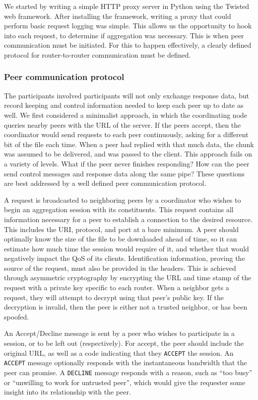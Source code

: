 \documentclass[12pt]{article}
\begin{document}
		We started by writing a simple HTTP proxy server in Python using the Twisted web framework. After installing the framework, writing a proxy that could perform basic request logging was simple. This allows us the opportunity to hook into each request, to determine if aggregation was necessary. This is when peer communication must be initiated. For this to happen effectively, a clearly defined protocol for router-to-router communication must be defined.


		\subsubsection{Peer communication protocol}

			The participants involved participants will not only exchange response data, but record keeping and control information needed to keep each peer up to date as well. We first considered a minimalist approach, in which the coordinating node queries nearby peers with the URL of the server. If the peers accept, then the coordinator would send requests to each peer continuously, asking for a different bit of the file each time. When a peer had replied with that much data, the chunk was assumed to be delivered, and was passed to the client. This approach fails on a variety of levels. What if the peer never finishes responding? How can the peer send control messages and response data along the same pipe? These questions are best addressed by a well defined peer communication protocol.

			A request is broadcasted to neighboring peers by a coordinator who wishes to begin an aggregation session with its constituents. This request contains all information necessary for a peer to establish a connection to the desired resource. This includes the URI, protocol, and port at a bare minimum. A peer should optimally know the size of the file to be downloaded ahead of time, so it can estimate how much time the session would require of it, and whether that would negatively impact the QoS of its clients. Identification information, proving the source of the request, must also be provided in the headers. This is achieved through asymmetric cryptography by encrypting the URL and time stamp of the request with a private key specific to each router. When a neighbor gets a request, they will attempt to decrypt using that peer's public key. If the decryption is invalid, then the peer is either not a trusted neighbor, or has been spoofed.

			An Accept/Decline message is sent by a peer who wishes to participate in a session, or to be left out (respectively). For accept, the peer should include the original URL, as well as a code indicating that they \texttt{ACCEPT} the session. An \texttt{ACCEPT} message optionally responds with the instantaneous bandwidth that the peer can promise. A \texttt{DECLINE} message responds with a reason, such as ``too busy'' or ``unwilling to work for untrusted peer'', which would give the requester some insight into its relationship with the peer.
\end{document}
